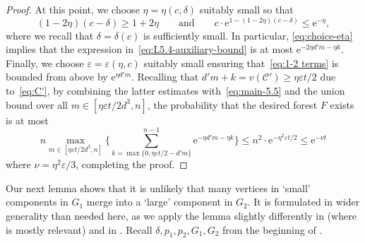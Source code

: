 \documentclass[reqno,final,a4paper]{amsart}
\theoremstyle{definition}
\def\e{\mathrm{e}}
\def\eps{\varepsilon}
\newcommand{\1}{\mathbbm{1}}
\begin{document}
\begin{proof}
At this point, we choose $\eta=\eta(c,\delta)$ suitably small so that 
\begin{equation}
(1-2\eta)(c-\delta)\geq 1+2\eta \qquad \text{and}\qquad  c\cdot \e^{1-(1-2\eta)(c-\delta)}\le \e^{-\eta},
\label{eq:choice-eta}
\end{equation}
where we recall that $\delta=\delta(c)$ is sufficiently small.
In particular, \eqref{eq:choice-eta} implies that the expression in~\eqref{eq:L5.4-auxiliary-bound} is at most $\e^{-2\eta d'm-\eta k}$. Finally, we choose $\eps=\eps(\eta,c)$ suitably small ensuring that~\eqref{eq:1-2 terms} is bounded from above by $\e^{\eta d'm}$. 
Recalling that $d'm+k=v(\mathcal{C}')\geq\eta\varepsilon t/2$ due to~\eqref{eq:C'}, by combining the latter estimates with~\eqref{eq:main-5.5} and the union bound over all $m\in [\eta \eps t/2d^3,n]$, the probability that the desired forest $F$ exists is at most
$$n\max_{m\in [\eta \eps t/2d^3,n]}\bigg\{\sum_{k=\max\{0,\eta \eps t/2-d'm\}}^{n-1}\e^{-\eta d'm-\eta k}\bigg\}\le n^2\cdot\e^{-\eta^2 \eps t/2}\le\e^{-\nu t}$$
where $\nu = \eta^2 \eps/3$, completing the proof.
\end{proof}

Our next lemma shows that it is unlikely that many vertices in `small' components in $G_1$ merge into a `large' component in $G_2$. 
It is formulated in wider generality than needed here, as we apply the lemma slightly differently in  (where  is mostly relevant) and in .
Recall $\delta, p_1, p_2, G_1, G_2$ from the beginning of .
\end{document}
